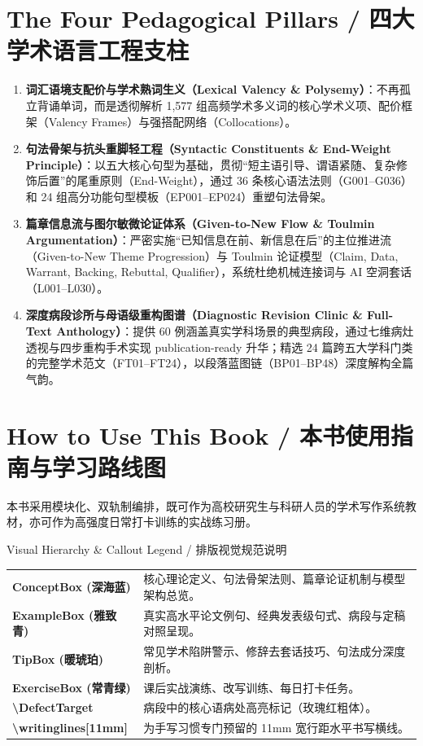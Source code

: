 \section*{The Four Pedagogical Pillars / 四大学术语言工程支柱}
\begin{enumerate}[label=\textbf{\color{AcadNavy}\arabic*.}, leftmargin=2em]
  \item \textbf{词汇语境支配价与学术熟词生义（Lexical Valency \& Polysemy）}：不再孤立背诵单词，而是透彻解析 1,577 组高频学术多义词的核心学术义项、配价框架（Valency Frames）与强搭配网络（Collocations）。
  \item \textbf{句法骨架与抗头重脚轻工程（Syntactic Constituents \& End-Weight Principle）}：以五大核心句型为基础，贯彻“短主语引导、谓语紧随、复杂修饰后置”的尾重原则（End-Weight），通过 36 条核心语法法则（G001--G036）和 24 组高分功能句型模板（EP001--EP024）重塑句法骨架。
  \item \textbf{篇章信息流与图尔敏微论证体系（Given-to-New Flow \& Toulmin Argumentation）}：严密实施“已知信息在前、新信息在后”的主位推进流（Given-to-New Theme Progression）与 Toulmin 论证模型（Claim, Data, Warrant, Backing, Rebuttal, Qualifier），系统杜绝机械连接词与 AI 空洞套话（L001--L030）。
  \item \textbf{深度病段诊所与母语级重构图谱（Diagnostic Revision Clinic \& Full-Text Anthology）}：提供 60 例涵盖真实学科场景的典型病段，通过七维病灶透视与四步重构手术实现 publication-ready 升华；精选 24 篇跨五大学科门类的完整学术范文（FT01--FT24），以段落蓝图链（BP01--BP48）深度解构全篇气韵。
\end{enumerate}

\section*{How to Use This Book / 本书使用指南与学习路线图}
本书采用模块化、双轨制编排，既可作为高校研究生与科研人员的学术写作系统教材，亦可作为高强度日常打卡训练的实战练习册。

\begin{ConceptBox}{Visual Hierarchy \& Callout Legend / 排版视觉规范说明}
\begin{tabularx}{\linewidth}{lX}
  \textbf{\color{AcadNavy}ConceptBox (深海蓝)} & 核心理论定义、句法骨架法则、篇章论证机制与模型架构总览。\\
  \textbf{\color{AcadTeal}ExampleBox (雅致青)} & 真实高水平论文例句、经典发表级句式、病段与定稿对照呈现。\\
  \textbf{\color{AcadAmber}TipBox (暖琥珀)} & 常见学术陷阱警示、修辞去套话技巧、句法成分深度剖析。\\
  \textbf{\color{AcadForest}ExerciseBox (常青绿)} & 课后实战演练、改写训练、每日打卡任务。\\
  \textbf{\color{TargetHighlight}\textbackslash DefectTarget} & 病段中的核心语病处高亮标记（玫瑰红粗体）。\\
  \textbf{\textbackslash writinglines[11mm]} & 为手写习惯专门预留的 11mm 宽行距水平书写横线。\\
\end{tabularx}
\end{ConceptBox}

